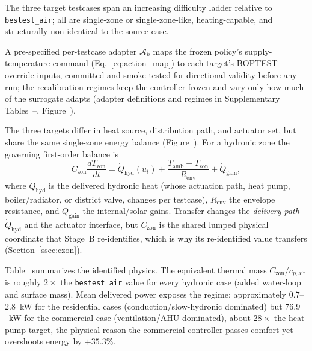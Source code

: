 The three target testcases span an increasing difficulty ladder relative to \texttt{bestest\_air}; all are single-zone or single-zone-like, heating-capable, and structurally non-identical to the source case.



A pre-specified per-testcase adapter $\mathcal{A}_k$ maps the frozen policy's supply-temperature command (Eq.~\eqref{eq:action_map}) to each target's BOPTEST override inputs, committed and smoke-tested for directional validity before any run; the recalibration regimes keep the controller frozen and vary only how much of the surrogate adapts (adapter definitions and regimes in Supplementary Tables~--, Figure~).










The three targets differ in heat source, distribution path, and actuator set, but share the same single-zone energy balance (Figure~). For a hydronic zone the governing first-order balance is
\begin{equation}
 C_{\mathrm{zon}}\frac{dT_{\mathrm{zon}}}{dt} = \dot{Q}_{\mathrm{hyd}}(u_t) + \frac{T_{\mathrm{amb}}-T_{\mathrm{zon}}}{R_{\mathrm{env}}} + \dot{Q}_{\mathrm{gain}},
 \label{eq:hydronic_balance}
\end{equation}
where $\dot{Q}_{\mathrm{hyd}}$ is the delivered hydronic heat (whose actuation path, heat pump, boiler/radiator, or district valve, changes per testcase), $R_{\mathrm{env}}$ the envelope resistance, and $\dot{Q}_{\mathrm{gain}}$ the internal/solar gains. Transfer changes the \emph{delivery path} $\dot{Q}_{\mathrm{hyd}}$ and the actuator interface, but $C_{\mathrm{zon}}$ is the shared lumped physical coordinate that Stage~B re-identifies, which is why its re-identified value transfers (Section~\ref{ssec:czon}).



Table~ summarizes the identified physics. The equivalent thermal mass $C_{\mathrm{zon}}/c_{p,\mathrm{air}}$ is roughly $2\times$ the \texttt{bestest\_air} value for every hydronic case (added water-loop and surface mass). Mean delivered power exposes the regime: approximately $0.7$--$2.8$~kW for the residential cases (conduction/slow-hydronic dominated) but $76.9$~kW for the commercial case (ventilation/AHU-dominated), about $28\times$ the heat-pump target, the physical reason the commercial controller passes comfort yet overshoots energy by $+35.3\%$.





